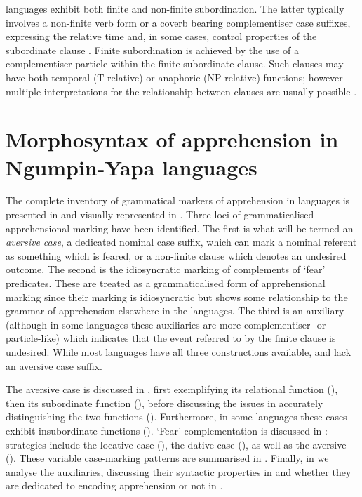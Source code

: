 \documentclass[output=paper,colorlinks,citecolor=brown]{langscibook}
\begin{document}
 languages exhibit both finite and non-finite subordination. The latter typically involves a non-finite verb form or a coverb bearing complementiser case suffixes, expressing the relative time and, in some cases, control properties of the subordinate clause \citep{simpson_control_1983}. Finite subordination is achieved by the use of a complementiser particle within the finite subordinate clause. Such clauses may have both temporal (T-relative) or anaphoric (NP-relative) functions; however multiple interpretations for the relationship between clauses are usually possible \citep{hale_adjoined_1976}.




\section{Morphosyntax of apprehension in Ngumpin-Yapa languages}
\label{sec:morphosyntax}

The complete inventory of grammatical markers of apprehension in  languages is presented in  and visually represented in . Three loci of grammaticalised apprehensional marking have been identified. The first is what will be termed an \textit{aversive case}, a dedicated nominal case suffix, which can mark a nominal referent as something which is feared, or a non-finite clause which denotes an undesired outcome. The second is the idiosyncratic marking of complements of `fear' predicates. These are treated as a grammaticalised form of apprehensional marking since their marking is idiosyncratic but shows some relationship to the grammar of apprehension elsewhere in the languages. The third is an auxiliary (although in some languages these auxiliaries are more complementiser- or particle-like) which indicates that the event referred to by the finite clause is undesired. While most languages have all three constructions available,  and  lack an aversive case suffix.





The aversive case is discussed in , first exemplifying its relational function (), then its subordinate function (), before discussing the issues in accurately distinguishing the two functions (). Furthermore, in some languages these cases exhibit insubordinate functions (). `Fear' complementation is discussed in : strategies include the locative case (), the dative case (), as well as the aversive (). These variable case-marking patterns are summarised in . Finally, in  we analyse the auxiliaries, discussing their syntactic properties in  and whether they are dedicated to encoding apprehension or not in .
\end{document}
